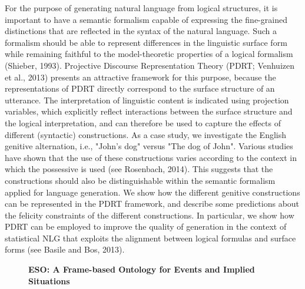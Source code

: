 \documentclass[10pt, a4paper, twopage, headinclude, footinclude, BCOR5mm]{scrartcl}
\begin{document}
        \begin{table}[t!]
    \end{table}

\noindent
For the purpose of generating natural language from logical structures, it is important to have a semantic formalism capable of expressing the fine-grained distinctions that are reflected in the syntax of the natural language. Such a formalism should be able to represent differences in the linguistic surface form while remaining faithful to the model-theoretic properties of a logical formalism (Shieber, 1993).  Projective Discourse Representation Theory (PDRT; Venhuizen et al., 2013) presents an attractive framework for this purpose, because the representations of PDRT directly correspond to the surface structure of an utterance. The interpretation of linguistic content is indicated using projection variables, which explicitly reflect interactions between the surface structure and the logical interpretation, and can therefore be used to capture the effects of different (syntactic) constructions.  As a case study, we investigate the English genitive alternation, i.e., "John's dog" versus "The dog of John". Various studies have shown that the use of these constructions varies according to the context in which the possessive is used (see Rosenbach, 2014). This suggests that the constructions should also be distinguishable within the semantic formalism applied for language generation.  We show how the different genitive constructions can be represented in the PDRT framework, and describe some predictions about the felicity constraints of the different constructions. In particular, we show how PDRT can be employed to improve the quality of generation in the context of statistical NLG that exploits the alignment between logical formulas and surface forms (see Basile and Bos, 2013).


\newpage

\begin{figure}[t!]
\centering
\large\textbf{ESO: A Frame-based Ontology for Events and Implied Situations}
\vspace*{0.5cm}
\end{figure}
\end{document}
